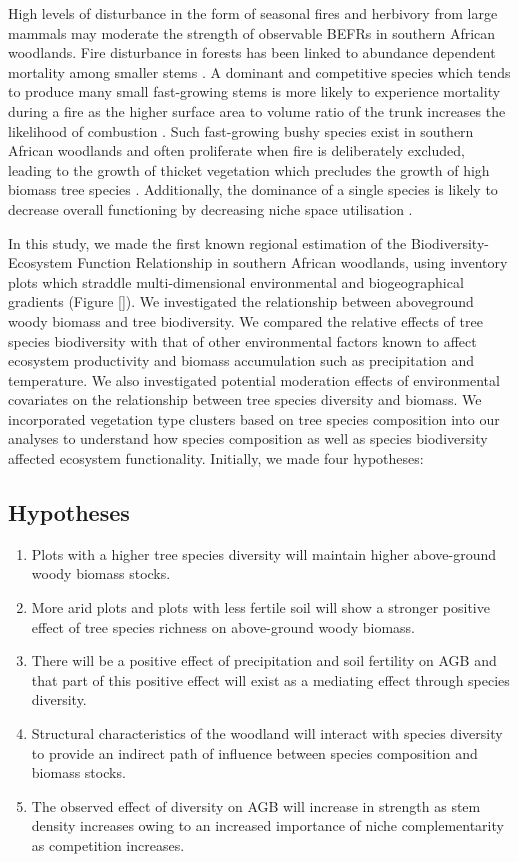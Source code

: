 \documentclass[11pt,a4paper]{article}
\begin{document}
High levels of disturbance in the form of seasonal fires and herbivory from large mammals \citep{Fireherbivore} may moderate the strength of observable BEFRs in southern African woodlands. Fire disturbance in forests has been linked to abundance dependent mortality among smaller stems \citep{Roques2001}. A dominant and competitive species which tends to produce many small fast-growing stems is more likely to experience mortality during a fire as the higher surface area to volume ratio of the trunk increases the likelihood of combustion \citep{}. Such fast-growing bushy species exist in southern African woodlands and often proliferate when fire is deliberately excluded, leading to the growth of thicket vegetation which precludes the growth of high biomass tree species \citep{nieto2018}. Additionally, the dominance of a single species is likely to decrease overall functioning by decreasing niche space utilisation \citep{Cardinale2002}.

In this study, we made the first known regional estimation of the Biodiversity-Ecosystem Function Relationship in southern African woodlands, using inventory plots which straddle multi-dimensional environmental and biogeographical gradients (Figure \autoref{}). We investigated the relationship between aboveground woody biomass and tree biodiversity. We compared the relative effects of tree species biodiversity with that of other environmental factors known to affect ecosystem productivity and biomass accumulation such as precipitation and temperature. We also investigated potential moderation effects of environmental covariates on the relationship between tree species diversity and biomass. We incorporated vegetation type clusters based on tree species composition \citep{} into our analyses to understand how species composition as well as species biodiversity affected ecosystem functionality. Initially, we made four hypotheses: 

\subsection{Hypotheses}

\begin{enumerate}
	\item{Plots with a higher tree species diversity will maintain higher above-ground woody biomass stocks.}
	\item{More arid plots and plots with less fertile soil will show a stronger positive effect of tree species richness on above-ground woody biomass.} 
	\item{There will be a positive effect of precipitation and soil fertility on AGB and that part of this positive effect will exist as a mediating effect through species diversity.}
	\item{Structural characteristics of the woodland will interact with species diversity to provide an indirect path of influence between species composition and biomass stocks.}
	\item{The observed effect of diversity on AGB will increase in strength as stem density increases owing to an increased importance of niche complementarity as competition increases.}
\end{enumerate}
\end{document}
